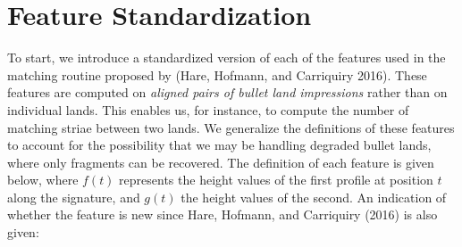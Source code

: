\documentclass[12pt,]{article}
\theoremstyle{definition}
\theoremstyle{definition}
\theoremstyle{definition}
\theoremstyle{remark}
\begin{document}
\section{Feature Standardization}\label{feature-standardization}

To start, we introduce a standardized version of each of the features
used in the matching routine proposed by (Hare, Hofmann, and Carriquiry
2016). These features are computed on \emph{aligned pairs of bullet land
impressions} rather than on individual lands. This enables us, for
instance, to compute the number of matching striae between two lands. We
generalize the definitions of these features to account for the
possibility that we may be handling degraded bullet lands, where only
fragments can be recovered. The definition of each feature is given
below, where \(f(t)\) represents the height values of the first profile
at position \(t\) along the signature, and \(g(t)\) the height values of
the second. An indication of whether the feature is new since Hare,
Hofmann, and Carriquiry (2016) is also given:
\end{document}
